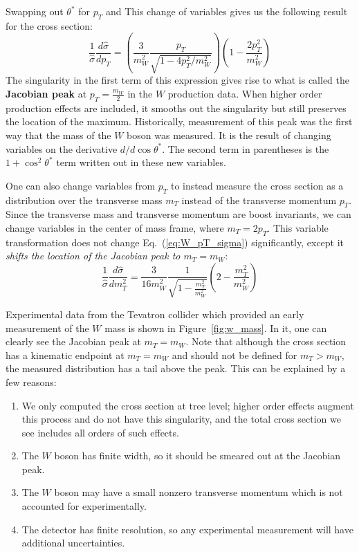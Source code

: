 \documentclass[11pt, oneside]{article}   	%
\theoremstyle{definition}
\numberwithin{equation}{subsection}		%
\begin{document}
\endgroup
Swapping out $\theta^*$ for $p_T$ and This change of variables gives us the following result for the cross section:
\begin{equation}
	\frac{1}{\hat\sigma}\frac{d\hat\sigma}{d p_T} = \left(\frac{3}{m_W^2} \frac{p_T}{\sqrt{1 - 4 p_T^2 / m_W^2}}\right) \left(1 - 
	\frac{2 p_T^2}{m_W^2}\right)
	\label{eq:W_pT_sigma}
\end{equation}
The singularity in the first term of this expression gives rise to what is called the \textbf{Jacobian peak} at $p_T = \frac{m_W}{2}$ in the $W$ 
production data. When higher order production effects are included, it smooths out the singularity but still preserves the location of the 
maximum. Historically, measurement of this peak was the first way that the mass of the $W$ boson was measured. It is the result 
of changing variables on the derivative $d / d\cos\theta^*$. The second term in parentheses is the $1 + \cos^2\theta^*$ term written out in 
these new variables. 

One can also change variables from $p_T$ to instead measure the cross section as a distribution over the transverse mass $m_T$ 
instead of the transverse momentum $p_T$. Since the transverse mass and transverse momentum are boost invariants, we can change 
variables in the center of mass frame, where $m_T = 2 p_T$. This variable transformation does not change Eq.~(\ref{eq:W_pT_sigma}) 
significantly, except it \textit{shifts the location of the Jacobian peak to $m_T = m_W$}:
\begin{equation}
	\frac{1}{\hat\sigma}\frac{d\hat\sigma}{d m_T^2} = \frac{3}{16 m_W^2}\frac{1}{\sqrt{1 - \frac{m_T^2}{m_W^2}}}\left(2 - \frac{m_T^2}{m_W^2}\right)
\end{equation}

Experimental data from the Tevatron collider which provided an early measurement of the $W$ mass is shown in Figure~\ref{fig:w_mass}. 
In it, one can clearly see the Jacobian peak at $m_T = m_W$. Note that although the cross section has a kinematic endpoint at $m_T = 
m_W$ and should not be defined for $m_T > m_W$, the measured distribution has a tail above the peak. This can be explained by a few 
reasons: 
\begin{enumerate}
	\item We only computed the cross section at tree level; higher order effects augment this process and do not have this singularity, and 
	the total cross section we see includes all orders of such effects.
	\item The $W$ boson has finite width, so it should be smeared out at the Jacobian peak.
	\item The $W$ boson may have a small nonzero transverse momentum which is not accounted for experimentally.
	\item The detector has finite resolution, so any experimental measurement will have additional uncertainties.
\end{enumerate}
\end{document}
